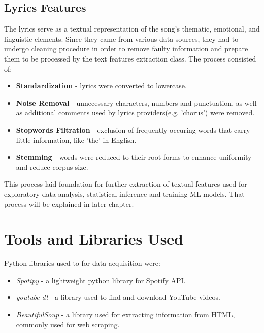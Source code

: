 \subsection{Lyrics Features}
 The lyrics serve as a textual representation of the song's thematic,
 emotional, and linguistic elements. Since they came from various data sources,
 they had  to undergo cleaning procedure in order to remove faulty information
 and prepare them to be processed by the text features extraction class. The
 process consisted of:
 \begin{itemize}
  \item \textbf{Standardization} - lyrics were converted to lowercase.
  \item \textbf{Noise Removal} - unnecessary characters, numbers and
    punctuation, as well as additional comments used by lyrics providers(e.g.
    'chorus') were removed.
  \item \textbf{Stopwords Filtration} - exclusion of frequently occuring words
    that carry little information, like 'the' in English.
  \item \textbf{Stemming} - words were reduced to their root forms to enhance
    uniformity and reduce corpus size.
 \end{itemize}

 This process laid foundation for further extraction of textual features used
 for exploratory data analysis, statistical inference and training ML models.
 That process will be explained in later chapter.



\section{Tools and Libraries Used}
\label{sec:toolsandlibrariesused}
Python libraries used to for data acquisition were:
\begin{itemize}
  \item \textit{Spotipy} \cite{spotipy}- a lightweight python library for
    Spotify API.
  \item \textit{youtube-dl} \cite{ytdl} - a library used to find and download
    YouTube videos.
  \item \textit{BeautifulSoup} \cite{beautifulsoup} - a library used for
    extracting information from HTML, commonly used for web scraping.
\end{itemize}



